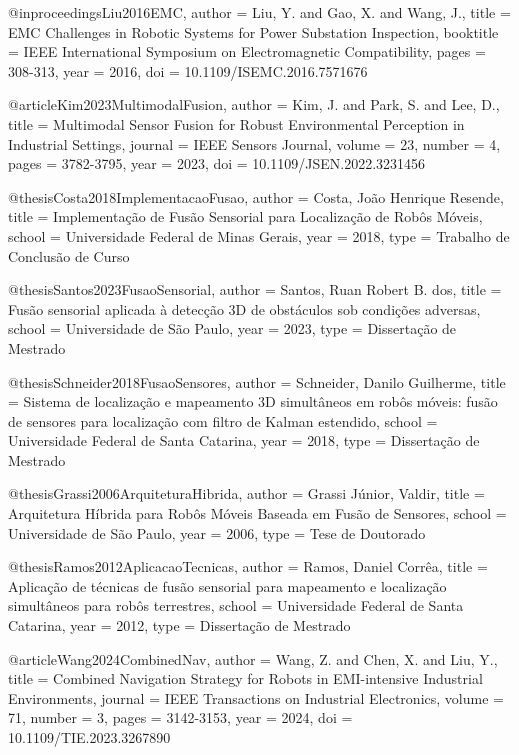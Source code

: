 @inproceedings{Liu2016EMC,
  author = {Liu, Y. and Gao, X. and Wang, J.},
  title = {EMC Challenges in Robotic Systems for Power Substation Inspection},
  booktitle = {IEEE International Symposium on Electromagnetic Compatibility},
  pages = {308-313},
  year = {2016},
  doi = {10.1109/ISEMC.2016.7571676}
}

@article{Kim2023MultimodalFusion,
  author = {Kim, J. and Park, S. and Lee, D.},
  title = {Multimodal Sensor Fusion for Robust Environmental Perception in Industrial Settings},
  journal = {IEEE Sensors Journal},
  volume = {23},
  number = {4},
  pages = {3782-3795},
  year = {2023},
  doi = {10.1109/JSEN.2022.3231456}
}

@thesis{Costa2018ImplementacaoFusao,
  author = {Costa, João Henrique Resende},
  title = {Implementação de Fusão Sensorial para Localização de Robôs Móveis},
  school = {Universidade Federal de Minas Gerais},
  year = {2018},
  type = {Trabalho de Conclusão de Curso}
}

@thesis{Santos2023FusaoSensorial,
  author = {Santos, Ruan Robert B. dos},
  title = {Fusão sensorial aplicada à detecção 3D de obstáculos sob condições adversas},
  school = {Universidade de São Paulo},
  year = {2023},
  type = {Dissertação de Mestrado}
}

@thesis{Schneider2018FusaoSensores,
  author = {Schneider, Danilo Guilherme},
  title = {Sistema de localização e mapeamento 3D simultâneos em robôs móveis: fusão de sensores para localização com filtro de Kalman estendido},
  school = {Universidade Federal de Santa Catarina},
  year = {2018},
  type = {Dissertação de Mestrado}
}

@thesis{Grassi2006ArquiteturaHibrida,
  author = {Grassi Júnior, Valdir},
  title = {Arquitetura Híbrida para Robôs Móveis Baseada em Fusão de Sensores},
  school = {Universidade de São Paulo},
  year = {2006},
  type = {Tese de Doutorado}
}

@thesis{Ramos2012AplicacaoTecnicas,
  author = {Ramos, Daniel Corrêa},
  title = {Aplicação de técnicas de fusão sensorial para mapeamento e localização simultâneos para robôs terrestres},
  school = {Universidade Federal de Santa Catarina},
  year = {2012},
  type = {Dissertação de Mestrado}
}

@article{Wang2024CombinedNav,
  author = {Wang, Z. and Chen, X. and Liu, Y.},
  title = {Combined Navigation Strategy for Robots in EMI-intensive Industrial Environments},
  journal = {IEEE Transactions on Industrial Electronics},
  volume = {71},
  number = {3},
  pages = {3142-3153},
  year = {2024},
  doi = {10.1109/TIE.2023.3267890}
}

